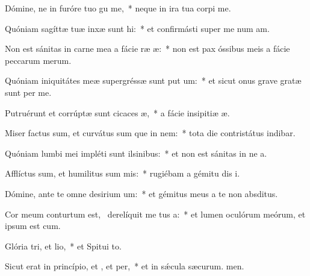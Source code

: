 \item Dómine, ne in furóre tuo gu me,~* neque in ira tua corpi me.
\item Quóniam sagíttæ tuæ inxæ sunt hi:~* et confirmásti super me num am.
\item Non est sánitas in carne mea a fácie ræ æ:~* non est pax óssibus meis a fácie peccarum merum.
\item Quóniam iniquitátes meæ supergréssæ sunt put um:~* et sicut onus grave gratæ sunt per me.
\item Putruérunt et corrúptæ sunt cicaces æ,~* a fácie insipitiæ æ.
\item Miser factus sum, et curvátus sum que in nem:~* tota die contristátus indibar.
\item Quóniam lumbi mei impléti sunt ilsinibus:~* et non est sánitas in ne a.
\item Afflíctus sum, et humilitus sum mis:~* rugiébam a gémitu dis i.
\item Dómine, ante te omne desirium um:~* et gémitus meus a te non  absditus.
\item Cor meum conturtum est,~\pscross{} derelíquit me tus a:~* et lumen oculórum meórum, et ipsum  est cum.
\item Glória tri, et lio,~* et Spitui to.
\item Sicut erat in princípio, et , et per,~* et in sǽcula sæcurum. men.
